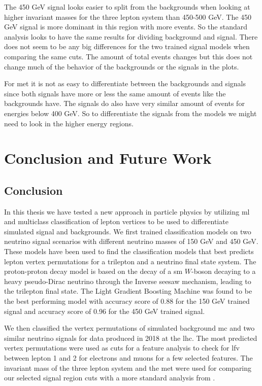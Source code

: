 \documentclass[a4paper, american, 12pt]{report}
\begin{document}
	The 450 GeV signal looks easier to split from the backgrounds when looking at higher invariant masses for the three lepton system than 450-500 GeV. The 450 GeV signal is more dominant in this region with more events. So the standard analysis looks to have the same results for dividing background and signal. There does not seem to be any big differences for the two trained signal models when comparing the same cuts. The amount of total events changes but this does not change much of the behavior of the backgrounds or the signals in the plots.
	
	For \acrshort{met} it is not as easy to differentiate between the backgrounds and signals since both signals have more or less the same amount of events like the backgrounds have. The signals do also have very similar amount of events for energies below 400 GeV. So to differentiate the signals from the models we might need to look in the higher energy regions.
	
	

	\chapter{Conclusion and Future Work}
	\label{chap:Conclusion}	
	
	\section{Conclusion}
	\label{sect:Conclusion-Conclusion}
	In this thesis we have tested a new approach in particle physics by utilizing \acrshort{ml} and multiclass classification of lepton vertices to be used to differentiate simulated signal and backgrounds. We first trained classification models on two neutrino signal scenarios with different neutrino masses of 150 GeV and 450 GeV. These models have been used to find the classification models that best predicts lepton vertex permutations for a trilepton and a neutrino final state system. The proton-proton decay model is based on the decay of a \acrshort{sm} $W$-boson decaying to a heavy pseudo-Dirac neutrino through the Inverse seesaw mechanism, leading to the trilepton final state. The Light Gradient Boosting Machine was found to be the best performing model with accuracy score of 0.88 for the 150 GeV trained signal and accuracy score of 0.96 for the 450 GeV trained signal.
	
	We then classified the vertex permutations of simulated background \acrshort{mc} and two similar neutrino signals for data produced in 2018 at the \acrshort{lhc}. The most predicted vertex permutations were used as cuts for a feature analysis to check for \acrshort{lfv} between lepton 1 and 2 for electrons and muons for a few selected features. The invariant mass of the three lepton system and the \acrshort{met} were used for comparing our selected signal region cuts with a more standard analysis from \citet{inverseseesaw}. 
	
\end{document}
